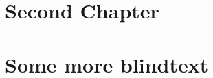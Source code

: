 \documentclass[
	fontsize=10pt, %
	twoside=false, %
	secnumdepth=1, %
]{kaobook}
\begin{document}
\chapter{Second Chapter}

\appendix %


\chapter{Some more blindtext}


\end{document}
